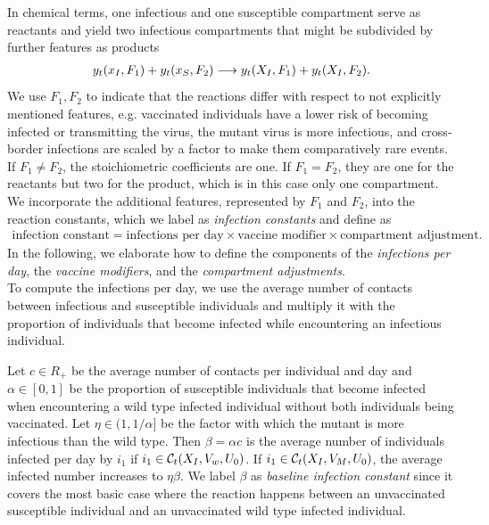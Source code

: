 In chemical terms, one infectious and one susceptible compartment serve as reactants and yield two infectious compartments that might be subdivided by further features as products
\begin{align}
\label{eq:general_infection}
y_t(x_I, F_1) + y_t(x_S, F_2) \longrightarrow y_t(X_I, F_1) + y_t(X_I, F_2).
\end{align}
We use $F_1, F_2$ to indicate that the reactions differ with respect to not explicitly mentioned features, e.g. vaccinated individuals have a lower risk of becoming infected or transmitting the virus, the mutant virus is more infectious, and cross-border infections are scaled by a factor to make them comparatively rare events. If $F_1 \neq F_2$, the stoichiometric coefficients are one. If $F_1=F_2$, they are one for the reactants but two for the product, which is in this case only one compartment. We incorporate the additional features, represented by $F_1$ and $F_2$, into the reaction constants, which we label as \textit{infection constants} and define as
\begin{align*}
\text{infection constant} = \text{infections per day} \times \text{vaccine modifier} \times \text{compartment adjustment}.
\end{align*}
In the following, we elaborate how to define the components of the \textit{infections per day}, the \textit{vaccine modifiers}, and the \textit{compartment adjustments}.\\

To compute the infections per day, we use the average number of contacts between infectious and susceptible individuals and multiply it with the proportion of individuals that become infected while encountering an infectious individual.

Let $c \in R_+$ be the average number of contacts per individual and day and $\alpha \in [0,1]$ be the proportion of susceptible individuals that become infected when encountering a wild type infected individual without both individuals being vaccinated. Let $\eta \in (1, 1/\alpha]$ be the factor with which the mutant is more infectious than the wild type. Then $\beta = \alpha c$ is the average number of individuals infected per day by $i_1$ if $i_1 \in \mathcal{C}_t(X_I, V_w, U_0)$. If $i_1 \in \mathcal{C}_t(X_I, V_M, U_0)$, the average infected number increases to $\eta \beta$. We label $\beta$ as \textit{baseline infection constant} since it covers the most basic case where the reaction happens between an unvaccinated susceptible individual and an unvaccinated wild type infected individual. \\

